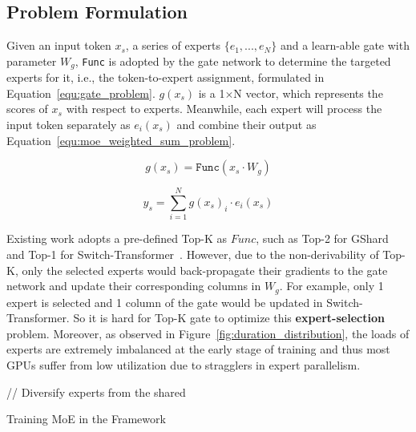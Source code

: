 \subsection{Problem Formulation}
Given an input token $x_s$, a series of experts $\{e_1,..., e_N\}$ and a learn-able gate with parameter $W_g$, \texttt{Func} is adopted by the gate network to determine the targeted experts for it, i.e., the token-to-expert assignment, formulated in Equation~\ref{equ:gate_problem}. $g(x_s)$ is a 1$\times$N vector, which represents the scores of $x_s$ with respect to experts.
Meanwhile, each expert will process the input token separately as $e_i(x_s)$ and combine their output as Equation~\ref{equ:moe_weighted_sum_problem}.

\begin{equation}
    g(x_s) = \texttt{Func}(x_{s} \cdot W_{g})
\label{equ:gate_problem}
\end{equation}

\begin{equation}
    y_{s} = \sum_{i=1}^{N}g(x_{s})_{i} \cdot e_{i}(x_{s})
\label{equ:moe_weighted_sum_problem}
\end{equation}

Existing work adopts a pre-defined Top-K as $Func$, such as Top-2 for GShard ~\cite{DBLP:gshard} and Top-1 for Switch-Transformer~\cite{DBLP:switch}. However, due to the non-derivability of Top-K, only the selected experts would back-propagate their gradients to the gate network and update their corresponding columns in $W_g$.
For example, only 1 expert is selected and 1 column of the gate would be updated in Switch-Transformer. So it is hard for Top-K gate to optimize this \textbf{expert-selection} problem.
Moreover, as observed in Figure~\ref{fig:duration_distribution}, the loads of experts are extremely imbalanced at the early stage of training and thus most GPUs suffer from low utilization due to stragglers in expert parallelism. 

\setlength{\textfloatsep}{0.1cm}
\begin{algorithm}[t]
	\SetAlgoLined
	\SetInd{0.61em}{0.61em}
    // Diversify experts from the shared \;
\caption{Training MoE in the \evomoe{} Framework}
\label{alg:std_algo}
\end{algorithm}

